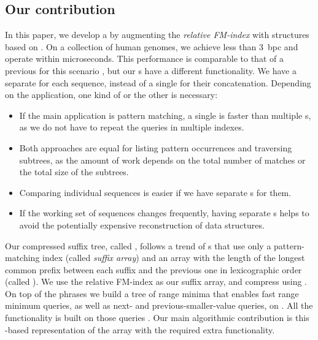 \subsection{Our contribution}

In this paper, we develop a \CST{} by augmenting the \emph{relative FM-index}
\cite{Belazzougui2014} with structures based on \RLZ.
On a collection of human genomes, we achieve less than 3~bpc and operate
within microseconds. This performance is comparable to that of a previous \CST{}
for this scenario \cite{Navarro2015}, but our \CST{}s have a different
functionality. We have a separate \CST{} for each sequence, instead of a single
\CST{} for their concatenation. Depending on the application, one kind of \CST{} or
the other is necessary:
\begin{itemize}
\item If the main application is pattern matching, a single \CST{} is faster than multiple \CST{}s,
as we do not have to repeat the queries in multiple indexes.
\item Both approaches are equal for listing pattern occurrences and traversing subtrees, as the amount
of work depends on the total number of matches or the total size of the subtrees.
\item Comparing individual sequences is easier if we have separate \CST{}s for them.
\item If the working set of sequences changes frequently, having separate \CST{}s helps to avoid the potentially expensive reconstruction of data structures.
\end{itemize}

Our compressed suffix tree, called \RCST, follows a trend of \CST{}s
\cite{Fischer2009a,Ohlebusch2009,Fis10,Ohlebusch2010,Gog2011a,Abeliuk2013} that use only a pattern-matching index
(called \emph{suffix array}) and an array with the length of the longest common prefix
between each suffix and the previous one in lexicographic order (called \LCP).
We use the relative FM-index as our suffix array, and
compress \LCP{} using \RLZ. On top of the \RLZ{} phrases we build a tree
of range minima that enables fast range minimum queries, as well as
next- and previous-smaller-value queries, on \LCP{} \cite{Abeliuk2013}. All the \CST{} functionality
is built on those queries \cite{Fischer2009a}. Our main algorithmic contribution
is this \RLZ\nobreakdash-based representation of the \LCP{} array with the required extra
functionality.

